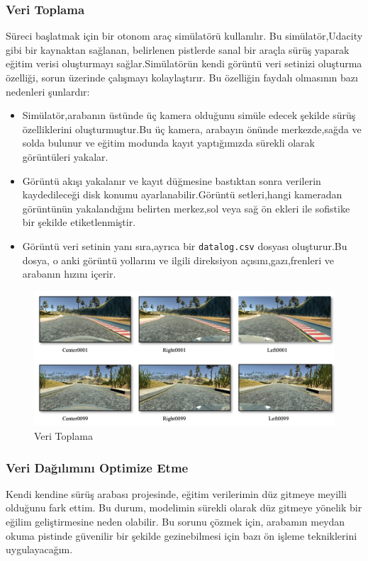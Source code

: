 \documentclass{article}
\begin{document}
\subsubsection{Veri Toplama}
Süreci başlatmak için bir otonom araç simülatörü kullanılır. Bu simülatör,Udacity gibi bir kaynaktan sağlanan, belirlenen pistlerde sanal bir araçla sürüş yaparak eğitim verisi oluşturmayı sağlar.Simülatörün kendi görüntü veri setinizi oluşturma özelliği, sorun üzerinde çalışmayı kolaylaştırır. Bu özelliğin faydalı olmasının bazı nedenleri şunlardır:
\begin{itemize}
    \item Simülatör,arabanın üstünde üç kamera olduğunu simüle edecek şekilde sürüş özelliklerini oluşturmuştur.Bu üç kamera, arabayın önünde merkezde,sağda ve solda bulunur ve eğitim modunda kayıt yaptığımızda sürekli olarak görüntüleri yakalar.
    \item Görüntü akışı yakalanır ve kayıt düğmesine bastıktan sonra verilerin kaydedileceği disk konumu ayarlanabilir.Görüntü setleri,hangi kameradan görüntünün yakalandığını belirten merkez,sol veya sağ ön ekleri ile sofistike bir şekilde etiketlenmiştir.
    \item Görüntü veri setinin yanı sıra,ayrıca bir \texttt{datalog.csv} dosyası oluşturur.Bu dosya, o anki görüntü yollarını ve ilgili direksiyon açısını,gazı,frenleri ve arabanın hızını içerir.
\end{itemize}
\begin{figure}[h]
  \centering
  \includegraphics[width=1.1\textwidth]{image/5..png} %
\caption{Veri Toplama}
  \label{fig:cnnmimari}  
\end{figure}
\subsubsection{Veri Dağılımını Optimize Etme}
Kendi kendine sürüş arabası projesinde, eğitim verilerimin düz gitmeye meyilli olduğunu fark ettim. Bu durum, modelimin sürekli olarak düz gitmeye yönelik bir eğilim geliştirmesine neden olabilir. Bu sorunu çözmek için, arabamın meydan okuma pistinde güvenilir bir şekilde gezinebilmesi için bazı ön işleme tekniklerini uygulayacağım.
\end{document}
